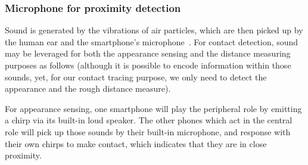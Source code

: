 \documentclass[graybox]{svmult}
\begin{document}
\subsubsection{Microphone for proximity detection}
\label{sound}

Sound is generated by the vibrations of air particles, which are then picked up by the human ear and the smartphone's microphone~\cite{murakami2018smartphone}. For contact detection, sound may be leveraged for both the appearance sensing and the distance measuring purposes as follows (although it is possible to encode information within those sounds, yet, for our contact tracing purpose, we only need to detect the appearance and the rough distance measure).

For appearance sensing, one smartphone will play the peripheral role by emitting a chirp via its built-in loud speaker. The other phones which act in the central role will pick up those sounds by their built-in microphone, and response with their own chirps to make contact, which indicates that they are in close proximity.
\end{document}
